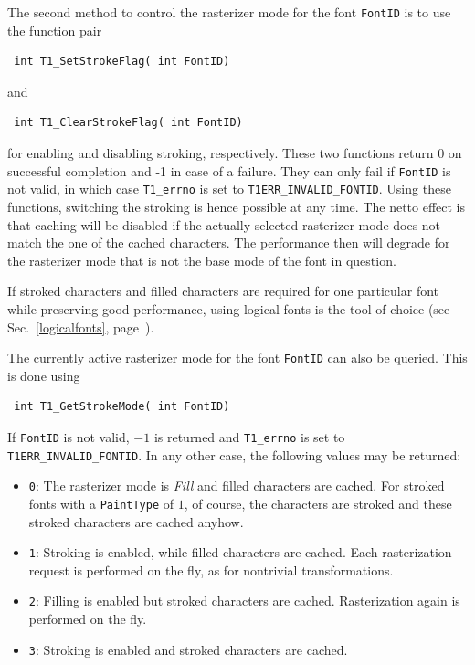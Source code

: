 The second method to control the rasterizer mode for the font \verb+FontID+ is
to use the function pair
\precorr
\begin{verbatim}
 int T1_SetStrokeFlag( int FontID)
\end{verbatim}\postcorr
and
\precorr
\begin{verbatim}
 int T1_ClearStrokeFlag( int FontID)
\end{verbatim}\postcorr
for enabling and disabling stroking, respectively.  These two functions return
0 on successful completion and -1 in case of a failure. They can only fail if
\verb+FontID+ is not valid, in which case \verb+T1_errno+ is set to
\verb+T1ERR_INVALID_FONTID+. Using these functions, switching the stroking is
hence possible at any time. The netto effect is that caching will be disabled
if the actually selected rasterizer mode does not match the one of the cached
characters. The performance then will degrade for the rasterizer mode that is
not the base mode of the font in question.

If stroked characters and filled characters are required for one particular
font while preserving good performance, using logical fonts is the tool of
choice (see Sec.~\ref{logicalfonts}, page~\pageref{logicalfonts}).

The currently active rasterizer mode for the font \verb+FontID+ can also be
queried. This is done using  
\precorr
\begin{verbatim}
 int T1_GetStrokeMode( int FontID)
\end{verbatim}\postcorr
If \verb+FontID+ is not valid, $-1$ is returned and \verb+T1_errno+ is set to
\verb+T1ERR_INVALID_FONTID+. In any other case, the following values may be
returned: 
\begin{itemize}
\item \verb+0+: The rasterizer mode is {\em Fill} and filled characters are
  cached. For stroked fonts with a \verb+PaintType+ of $1$, of course, the
  characters are stroked and these stroked characters are cached anyhow.
\item \verb+1+: Stroking is enabled, while filled characters are cached. Each
  rasterization request is performed on the fly, as for nontrivial
  transformations.
\item \verb+2+: Filling is enabled but stroked characters are
  cached. Rasterization again is performed on the fly.
\item \verb+3+: Stroking is enabled and stroked characters are cached.
\end{itemize}

